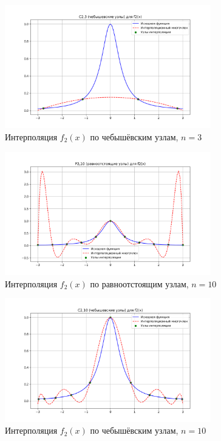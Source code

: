 \documentclass[12pt]{article}
\begin{document}
\begin{figure}[H]
    \centering
    \includegraphics[width=0.8\textwidth]{C2_3.png}
    \caption{Интерполяция $f_2(x)$ по чебышёвским узлам, $n=3$}
\end{figure}

\begin{figure}[H]
    \centering
    \includegraphics[width=0.8\textwidth]{P2_10.png}
    \caption{Интерполяция $f_2(x)$ по равноотстоящим узлам, $n=10$}
\end{figure}

\begin{figure}[H]
    \centering
    \includegraphics[width=0.8\textwidth]{C2_10.png}
    \caption{Интерполяция $f_2(x)$ по чебышёвским узлам, $n=10$}
\end{figure}
\end{document}
